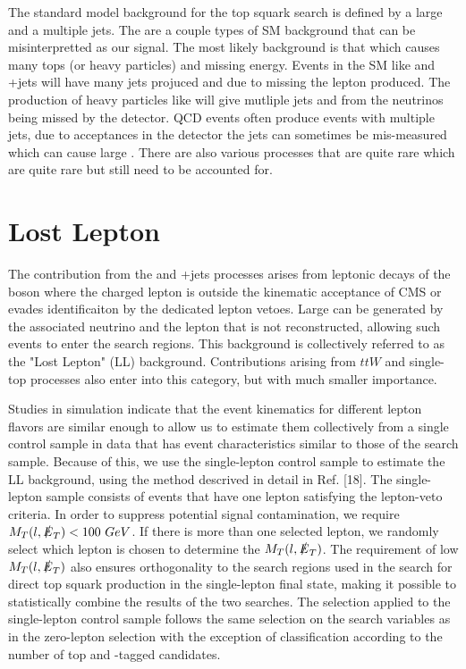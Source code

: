 The standard model background for the top squark search is defined by a large \met{} and a multiple jets. The are a couple types of SM background that can be misinterpretted as our signal. The most likely background is that which causes many tops (or heavy particles) and missing energy. Events in the SM like \ttbar{} and \W+jets will have many jets projuced and \met{} due to missing the lepton produced. The production of heavy particles like \Znunu{} will give mutliple jets and \met{} from the neutrinos being missed by the detector. QCD events often produce events with multiple jets, due to acceptances in the detector the jets can sometimes be mis-measured which can cause large \met{}. There are also various processes that are quite rare which are quite rare but still need to be accounted for. 

\section{Lost Lepton}
\label{subsec:LL}

The contribution from the \ttbar{} and \W+jets processes arises from leptonic decays of the \W{} boson where the charged lepton is outside the kinematic acceptance of CMS or evades identificaiton by the dedicated lepton vetoes. Large \met{} can be generated by the associated neutrino and the lepton that is not reconstructed, allowing such events to enter the search regions. This background is collectively referred to as the "Lost Lepton" (LL) background. Contributions arising from $ttW$ and single-top processes also enter into this category, but with much smaller importance. 

Studies in simulation indicate that the event kinematics for different lepton flavors are similar enough to allow us to estimate them collectively from a single control sample in data that has event characteristics similar to those of the search sample. Because of this, we use the single-lepton control sample to estimate the LL background, using the method descrived in detail in Ref. [18]. The single-lepton sample consists of events that have one lepton satisfying the lepton-veto criteria. In order to suppress potential signal contamination, we require $M_T(l,\slashed{E}_{T})<100~GeV$. If there is more than one selected lepton, we randomly select which lepton is chosen to determine the $M_T(l,\slashed{E}_{T})$. The requirement of low $M_T(l,\slashed{E}_{T})$ also ensures orthogonality to the search regions used in the search for direct top squark production in the single-lepton final state, making it possible to statistically combine the results of the two searches. The selection applied to the single-lepton control sample follows the same selection on the search variables as in the zero-lepton selection with the exception of classification according to the number of top and \W-tagged candidates. 

